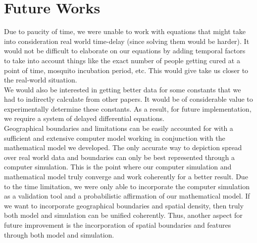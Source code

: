 \documentclass{article}
\begin{document}
\section{Future Works}
Due to paucity of time, we were unable to work with equations that might take into consideration real world time-delay (since solving them would be harder). It would not be difficult to elaborate on our equations by adding temporal factors to take into account things like the exact number of people getting cured at a point of time, mosquito incubation period, etc. This would give take us closer to the real-world situation.\\
We would also be interested in getting better data for some constants that we had to indirectly calculate from other papers. It would be of considerable value to experimentally determine these constants. As a result, for future implementation, we require a system of delayed differential equations.\\

Geographical boundaries and limitations can be easily accounted for with a sufficient and extensive computer model working in conjunction with the mathematical model we developed. The only accurate way to depiction spread over real world data and boundaries can only be best represented through a computer simulation. This is the point where our computer simulation and mathematical model truly converge and work coherently for a better result. Due to the time limitation, we were only able to incorporate the computer simulation as a validation tool and a probabilistic affirmation of our mathematical model. If we want to incorporate geographical boundaries and spatial density, then truly both model and simulation can be unified coherently. Thus, another aspect for future improvement is the incorporation of spatial boundaries and features through both model and simulation.\\
\end{document}

